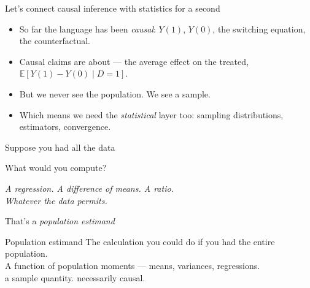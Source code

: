 \documentclass[aspectratio=169,11pt]{beamer}
\begin{document}
\begin{frame}{Let's connect causal inference with statistics for a second}
\vspace{0.6em}
\begin{itemize}
  \item So far the language has been \textit{causal}: $Y(1)$, $Y(0)$, the switching equation, the counterfactual.
  \item Causal claims are about  --- the average effect on the treated, $\mathbb{E}[Y(1) - Y(0) \mid D = 1]$.
  \item But we never see the population. We see a sample.
  \item Which means we need the \textit{statistical} layer too: sampling distributions, estimators, convergence.
\end{itemize}
\vspace{0.6em}
\end{frame}

\begin{frame}{Suppose you had all the data}
\vspace{1.5em}
\begin{center}
\large
\color{charcoal}What would you compute?
\end{center}
\vspace{2em}
\begin{center}
\small\color{warmgray}\itshape A regression. A difference of means. A ratio. \\Whatever the data permits.
\end{center}
\end{frame}

\begin{frame}{That's a \textit{population estimand}}
\vspace{0.6em}
\begin{block}{Population estimand}
The calculation you could do if you had the entire population. \\[0.4em]
A function of population moments --- means, variances, regressions. \\[0.4em]
 a sample quantity.  necessarily causal.
\end{block}
\vspace{0.6em}
\end{frame}
\end{document}

